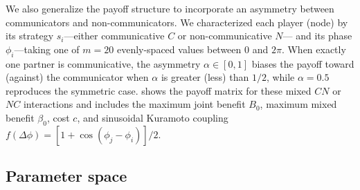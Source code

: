 \documentclass[10pt,letterpaper]{article}
\begin{document}
We also generalize the payoff structure to incorporate
an asymmetry between communicators and non-communicators.
We characterized each player (node) by its
strategy $s_i$---either communicative $C$ or non-communicative $N$---
and its phase $\phi_i$---taking one of $m = \num{20}$ evenly-spaced values
between $0$ and $2 \pi$.
When exactly one partner is communicative, the
asymmetry $\alpha \in [0,1]$ biases the payoff toward (against)
the communicator when $\alpha$ is greater (less) than $1/2$,
while $\alpha = 0.5$ reproduces the symmetric case.
 shows the payoff matrix
for these mixed $CN$ or $NC$ interactions
and includes the maximum joint benefit $B_0$,
maximum mixed benefit $\beta_0$, cost $c$,
and sinusoidal Kuramoto coupling
$f(\Delta \phi) = [1+\cos(\phi_j - \phi_i)]/2$.

\subsection{Parameter space}
\end{document}
